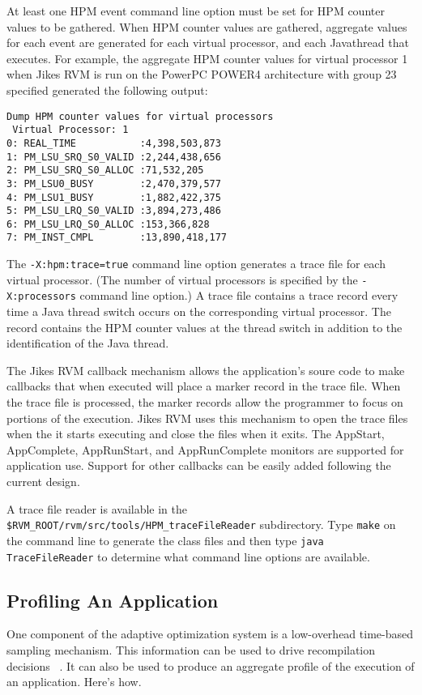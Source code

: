 At least one HPM event command line option must be set for HPM counter values to be gathered.  
When HPM counter values are gathered, aggregate values for each event 
are generated for each virtual processor, and each Java\TMweb thread that executes.
For example, the aggregate HPM counter values for virtual processor 1
when Jikes RVM is run on the PowerPC\TMweb{} POWER4 architecture with group 23 
specified generated the following output:

\begin{verbatim}
Dump HPM counter values for virtual processors
 Virtual Processor: 1
0: REAL_TIME           :4,398,503,873
1: PM_LSU_SRQ_S0_VALID :2,244,438,656
2: PM_LSU_SRQ_S0_ALLOC :71,532,205
3: PM_LSU0_BUSY        :2,470,379,577
4: PM_LSU1_BUSY        :1,882,422,375
5: PM_LSU_LRQ_S0_VALID :3,894,273,486
6: PM_LSU_LRQ_S0_ALLOC :153,366,828
7: PM_INST_CMPL        :13,890,418,177
\end{verbatim}

The {\tt -X:hpm:trace=true} command line option generates a trace file for each 
virtual processor. 
(The number of virtual processors is specified by the {\tt -X:processors} command line option.)
A trace file contains a trace record every time a Java thread switch occurs on the 
corresponding virtual processor.
The record contains the HPM counter values at the thread switch in addition to 
the identification of the Java thread.

The Jikes RVM callback mechanism allows the application's soure code 
to make callbacks that when executed will place a marker record in the trace file.
When the trace file is processed, the marker records allow the
programmer to focus on portions of the execution.
Jikes RVM uses this mechanism to open the trace files
when the it starts executing and close the files when it exits.
The AppStart, AppComplete, AppRunStart, and AppRunComplete monitors
are supported for application use.  
Support for other callbacks can be easily added following the current design.

A trace file reader is available in the {\tt \$RVM\_\-ROOT/rvm/src/tools/HPM\_traceFileReader}
subdirectory.  Type {\tt make} on the command line to generate the class files and then 
type {\tt java TraceFileReader} to determine what command line options are available.


\subsection{Profiling An Application}
One component of the adaptive optimization system is a low-overhead
time-based sampling mechanism.  This information can be used to drive
recompilation decisions
\T~\cite{jalapeno-adaptive-00}.
It can also be used to produce an aggregate
profile of the execution of an application.  
Here's how.

